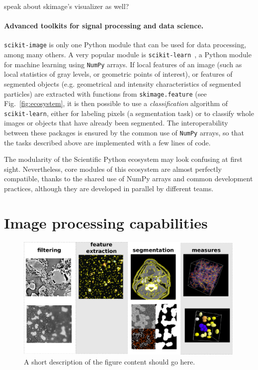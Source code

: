 \documentclass[twocolumn]{bmcart}%
\begin{document}
speak about skimage's visualizer as well?

\paragraph{Advanced toolkits for signal processing and data science.}

\texttt{scikit-image} is only one Python module that can be used for data
processing, among many others. A very popular module is
\texttt{scikit-learn}~\citep{Pedregosa2011}, a Python module for machine
learning using \texttt{NumPy} arrays. If local features of an image
(such as local statistics of gray levels, or geometric points of
interest), or features of segmented objects (e.g. geometrical and
intensity characteristics of segmented particles) are extracted with
functions from \texttt{skimage.feature} (see Fig.~\ref{fig:ecosystem}, it
is then possible to use a \emph{classification} algorithm of
\texttt{scikit-learn}, either for labeling pixels (a segmentation task)
or to classify whole images or objects that have already been segmented.
The interoperability between these packages is ensured by the common use
of \texttt{NumPy} arrays, so that the tasks described above are
implemented with a few lines of code.

The modularity of the Scientific Python ecosystem may look
confusing at first sight. Nevertheless, core modules of this ecosystem
are almost perfectly compatible, thanks to the shared use of NumPy arrays
and common development practices, although they are developed in parallel
by different teams. 


\section*{Image processing capabilities}

\begin{figure}
    \centerline{\includegraphics[width=0.99\textwidth]{tomo_gallery}}
\caption{
      A short description of the figure content
      should go here.}
\end{figure}
\end{document}
